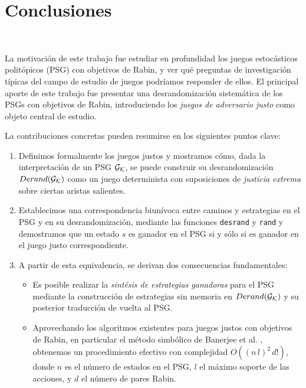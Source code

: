 \chapter{Conclusiones}
~\label{cap:conclusions}

La motivación de este trabajo fue estudiar en profundidad los juegos
estocásticos politópicos (PSG) con objetivos de Rabin, y ver qué preguntas de
investigación típicas del campo de estudio de juegos podríamos responder de
ellos. El principal aporte de este trabajo fue presentar una desrandomización
sistemática de los PSGs con objetivos de Rabin, introduciendo los \emph{juegos
	de adversario justo} como objeto central de estudio.

La contribuciones concretas pueden resumirse en los siguientes puntos clave:

\begin{enumerate}
	\item Definimos formalmente los juegos justos y mostramos cómo, dada la
	      interpretación de un PSG $\mathcal{G}_{\mathcal{K}}$, se puede construir su desrandomización $Derand(\mathcal{G}_{\mathcal{K}})$
	      como un juego determinista con suposiciones de \emph{justicia extrema} sobre
	      ciertas aristas salientes.
	\item Establecimos una correspondencia biunívoca entre caminos y estrategias en el
	      PSG y en su desrandomización, mediante las funciones \texttt{desrand} y
	      \texttt{rand} y demostramos que un estado $s$ es ganador en el PSG si y sólo si
	      es ganador en el juego justo correspondiente.
	\item A partir de esta equivalencia, se derivan dos consecuencias fundamentales:
	      \begin{itemize}
		      \item Es posible realizar la \emph{sintésis de estrategias ganadoras} para el PSG
		            mediante la construcción de estrategias sin memoria en $Derand(\mathcal{G}_{\mathcal{K}})$ y su posterior
		            traducción de vuelta al PSG.
		      \item Aprovechando los algoritmos existentes para juegos justos con objetivos de
		            Rabin, en particular el método simbólico de Banerjee et al. \cite{Banerjee},
		            obtenemos un procedimiento efectivo con complejidad $O((n\,l)^2\,d!)$, donde
		            $n$ es el número de estados en el PSG, $l$ el máximo soporte de las acciones, y
		            $d$ el número de pares Rabin.
	      \end{itemize}
\end{enumerate}

